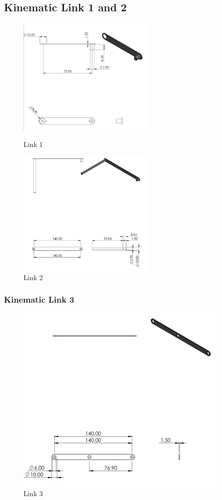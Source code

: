 \subsection{Kinematic Link 1 and 2}
\begin{figure}[p]
        \centering
        \includegraphics[width=0.6\textwidth, height=0.4\textheight]{Figures/link1.PNG}
        \caption{Link 1}
        \includegraphics[width=0.6\textwidth, height=0.4\textheight]{Figures/link2.PNG}
        \caption{Link 2}
    \end{figure}
    
\subsubsection{Kinematic Link 3}
\begin{figure}[H]
        \centering
        \includegraphics{Figures/link3.PNG}
        \caption{Link 3}
\end{figure}

